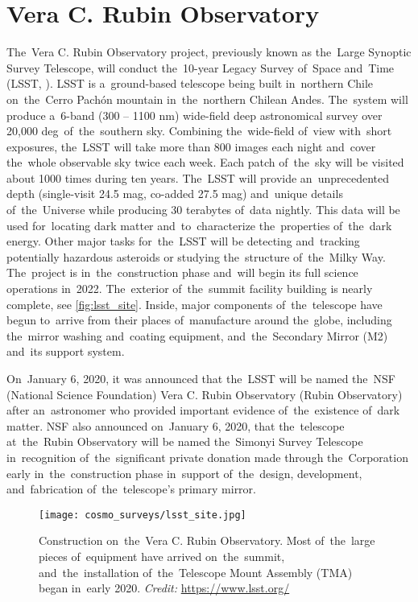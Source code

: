 \section{Vera C. Rubin Observatory}
The~Vera C. Rubin Observatory project, previously known as the~Large Synoptic Survey Telescope, will conduct the~10-year Legacy Survey of~Space and~Time (LSST, \cite{lsst}). LSST is a~ground-based telescope being built in~northern Chile on~the~Cerro Pach\'{o}n mountain in~the~northern Chilean Andes. The~system will produce a~6-band (300 -- 1100 nm) wide-field deep astronomical survey over 20,000 deg\sq\ of~the~southern sky. Combining the~wide-field of~view with~short exposures, the~LSST will take more than 800 images each night and~cover the~whole observable sky twice each week. Each patch of~the~sky will be visited about 1000 times during ten years. The~LSST will provide an~unprecedented depth (single-visit 24.5 mag, co-added 27.5 mag) and~unique details of~the~Universe while producing 30 terabytes of~data nightly. This data will be used for~locating dark matter and~to~characterize the~properties of~the~dark energy. Other major tasks for~the~LSST will be detecting and~tracking potentially hazardous asteroids or studying the~structure of~the~Milky Way. The~project is in~the~construction phase and~will begin its full science operations in~2022. The~exterior of~the~summit facility building is nearly complete, see \autoref{fig:lsst_site}. Inside, major components of~the~telescope have begun to~arrive from their places of~manufacture around the~globe, including the~mirror washing and~coating equipment, and~the~Secondary Mirror (M2) and~its support system.

On~January 6, 2020, it was announced that the~LSST will be named the~NSF (National Science Foundation) Vera C. Rubin Observatory (Rubin Observatory) after an~astronomer who provided important evidence of~the~existence of~dark matter. NSF also announced on~January 6, 2020, that the~telescope at~the~Rubin Observatory will be named the~Simonyi Survey Telescope in~recognition of~the~significant private donation made through the~Corporation early in~the~construction phase in~support of~the~design, development, and~fabrication of~the~telescope's primary mirror.
\begin{figure}[htb]
    \centering
    \texttt{[image: cosmo\_surveys/lsst\_site.jpg]}
    \caption{Construction on~the~Vera C. Rubin Observatory. Most of~the~large pieces of~equipment have arrived on~the~summit, and~the~installation of~the~Telescope Mount Assembly (TMA) began in~early 2020. \textit{Credit:} \url{https://www.lsst.org/}}
    \label{fig:lsst_site}
\end{figure}

